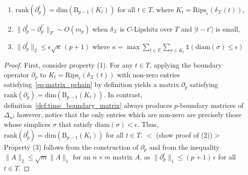 \documentclass[10pt]{article}
\newtheorem{definition}{Definition}
\begin{document}
\begin{enumerate}
	\item $\mathrm{rank}(\partial_p^t) = \mathrm{dim}(\mathrm{B}_{p-1}(K_t))$ for all $t \in T$, where $K_t = \mathrm{Rips}_{\epsilon}(\delta_{\mathcal{X}}(t))$, 
	\item $\lVert \partial_p^t - \partial_p^{t'} \rVert_F \sim O(m_p)$ when $\delta_\mathcal{X}$ is $C$-Lipshitz over $T$ and $\lvert t - t' \rvert$ is small,
	\item $\lVert \partial_p^t \rVert_{2} \leq \epsilon \sqrt{\kappa} \, (p+1)$ where $\kappa = \max \sum\limits_{t \in T}\sum\limits_{\sigma \in K_t}\mathds{1}(\mathrm{diam}(\sigma) \leq \epsilon)$
\end{enumerate}
\begin{proof}
First, consider property (1). For any $t \in T$, applying the boundary operator $\partial_p$ to $K_t = \mathrm{Rips}_\epsilon(\delta_{\mathcal{X}}(t))$ with non-zero entries satisfying~\eqref{eq:matrix_pchain} by definition yields a matrix $\partial_p$ satisfying $\mathrm{rank}(\partial_p) = \mathrm{dim}(\mathrm{B}_{p-1}(K_t))$. In contrast, definition~\eqref{def:time_boundary_matrix} always produces $p$-boundary matrices of $\Delta_n$; however, notice that the only entries which are non-zero are precisely those whose simplices $\sigma$ that satisfy $\mathrm{diam}(\sigma) < \epsilon$. Thus, $\mathrm{rank}(\partial_p^t) = \mathrm{dim}(\mathrm{B}_{p-1}(K_t))$ for all $t \in T$. 
$<$ (show proof of (2))$>$
Property (3) follows from the construction of $\partial_p$ and from the inequality $\lVert A \rVert_2 \leq \sqrt{m} \lVert A \rVert_1$ for an $n \times m$ matrix $A$, as $\lVert \partial_p^t \rVert_1 \leq (p+1) \, \epsilon$ for all $t \in T$.

\end{proof}
\end{document}
